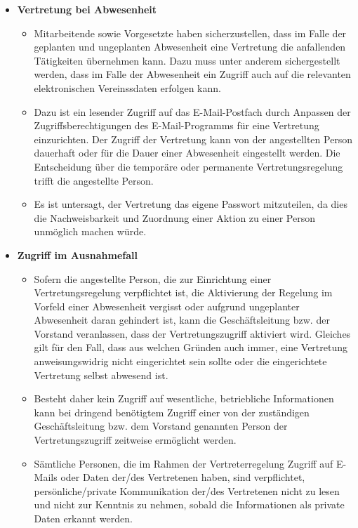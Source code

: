 \documentclass[a4paper, fontsize=11pt]{scrartcl}
\begin{document}
\begin{itemize}
  \item \textbf{Vertretung bei Abwesenheit}
  \begin{itemize}
    \item Mitarbeitende sowie Vorgesetzte haben sicherzustellen, dass im Falle der geplanten und ungeplanten Abwesenheit eine Vertretung die anfallenden Tätigkeiten übernehmen kann. Dazu muss unter anderem sichergestellt werden, dass im Falle der Abwesenheit ein Zugriff auch auf die relevanten elektronischen Vereinssdaten erfolgen kann.
    \item Dazu ist ein lesender Zugriff auf das E-Mail-Postfach durch Anpassen der Zugriffsberechtigungen des E-Mail-Programms für eine Vertretung einzurichten. Der Zugriff der Vertretung kann von der angestellten Person dauerhaft oder für die Dauer einer Abwesenheit eingestellt werden. Die Entscheidung über die temporäre oder permanente Vertretungsregelung trifft die angestellte Person.
    \item Es ist untersagt, der Vertretung das eigene Passwort mitzuteilen, da dies die Nachweisbarkeit und Zuordnung einer Aktion zu einer Person unmöglich machen würde.
  \end{itemize}
  \item \textbf{Zugriff im Ausnahmefall}
  \begin{itemize}
    \item Sofern die angestellte Person, die zur Einrichtung einer Vertretungsregelung verpflichtet ist, die Aktivierung der Regelung im Vorfeld einer Abwesenheit vergisst oder aufgrund ungeplanter Abwesenheit daran gehindert ist, kann die Geschäftsleitung bzw. der Vorstand veranlassen, dass der Vertretungszugriff aktiviert wird. Gleiches gilt für den Fall, dass aus welchen Gründen auch immer, eine Vertretung anweisungswidrig nicht eingerichtet sein sollte oder die eingerichtete Vertretung selbst abwesend ist.
    \item Besteht daher kein Zugriff auf wesentliche, betriebliche Informationen kann bei dringend benötigtem Zugriff einer von der zuständigen Geschäftsleitung bzw. dem Vorstand genannten Person der Vertretungszugriff zeitweise ermöglicht werden.
    \item Sämtliche Personen, die im Rahmen der Vertreterregelung Zugriff auf E-Mails oder Daten der/des Vertretenen haben, sind verpflichtet, persönliche/private Kommunikation der/des Vertretenen nicht zu lesen und nicht zur Kenntnis zu nehmen, sobald die Informationen als private Daten erkannt werden.
  \end{itemize}
\end{itemize}
\end{document}
